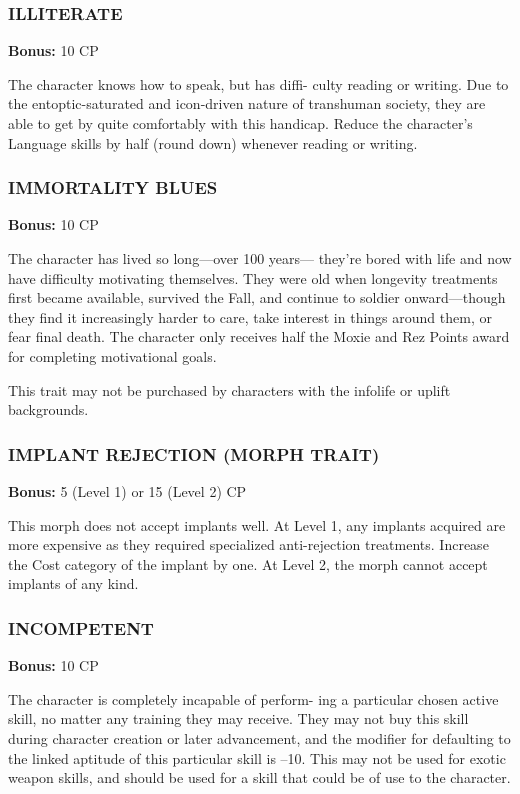 \subsubsection{ILLITERATE}
\textbf{Bonus:} 10 CP

The character knows how to speak, but has diffi-
culty reading or writing. Due to the entoptic-saturated
and icon-driven nature of transhuman society, they are
able to get by quite comfortably with this handicap.
Reduce the character’s Language skills by half (round
down) whenever reading or writing.

\subsubsection{IMMORTALITY BLUES}
\textbf{Bonus:} 10 CP

The character has lived so long—over 100 years—
they’re bored with life and now have difficulty
motivating themselves. They were old when longevity
treatments first became available, survived the Fall,
and continue to soldier onward—though they find
it increasingly harder to care, take interest in things
around them, or fear final death. The character only
receives half the Moxie and Rez Points award for
completing motivational goals.

This trait may not be purchased by characters with
the infolife or uplift backgrounds.

\subsubsection{IMPLANT REJECTION (MORPH TRAIT)}
\textbf{Bonus:} 5 (Level 1) or 15 (Level 2) CP

This morph does not accept implants well. At Level
1, any implants acquired are more expensive as they
required specialized anti-rejection treatments. Increase
the Cost category of the implant by one. At Level 2,
the morph cannot accept implants of any kind.

\subsubsection{INCOMPETENT}
\textbf{Bonus:} 10 CP

The character is completely incapable of perform-
ing a particular chosen active skill, no matter any
training they may receive. They may not buy this skill
during character creation or later advancement, and
the modifier for defaulting to the linked aptitude of
this particular skill is –10. This may not be used for
exotic weapon skills, and should be used for a skill
that could be of use to the character.

